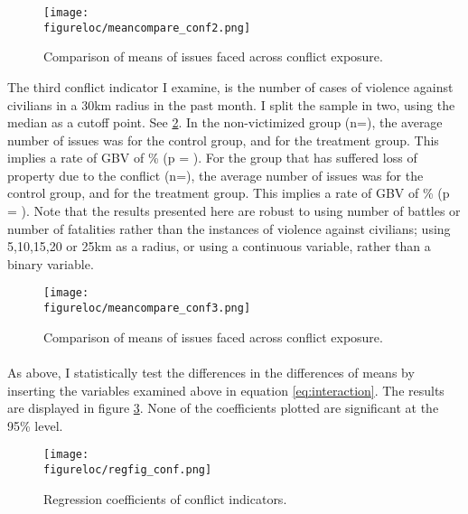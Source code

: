\documentclass[11pt,a4paper]{scrartcl} %
\newcommand{\figureloc}{C:/Users/Koen/Dropbox/PhD/Papers/CongoGBV/Figures}
\begin{document}
\begin{figure}[H]
  \texttt{[image: \\figureloc/meancompare\_conf2.png]}
  \caption{Comparison of means of issues faced across conflict exposure.}
  \label{fig:meancompare_conf2}
\end{figure}


The third conflict indicator I examine, is the number of cases of violence against civilians in a 30km radius in the past month. I split the sample in two, using the median as a cutoff point. See \ref{fig:meancompare_conf3}. In the non-victimized group (n=), the average number of issues was  for the control group, and  for the treatment group. This implies a rate of GBV of \% (p = ). For the group that has suffered loss of property due to the conflict (n=), the average number of issues was  for the control group, and  for the treatment group. This implies a rate of GBV of \% (p = ). Note that the results presented here are robust to using number of battles or number of fatalities rather than the instances of violence against civilians; using 5,10,15,20 or 25km as a radius, or using a continuous variable, rather than a binary variable.  

\begin{figure}[H]
  \texttt{[image: \\figureloc/meancompare\_conf3.png]}
  \caption{Comparison of means of issues faced across conflict exposure.}
  \label{fig:meancompare_conf3}
\end{figure}


\paragraph{}
As above, I statistically test the differences in the differences of means by inserting the variables examined above in equation \ref{eq:interaction}. The results are displayed in figure \ref{fig:regfig_conf}. None of the coefficients plotted are significant at the 95\% level.

\begin{figure}[H]
  \texttt{[image: \\figureloc/regfig\_conf.png]}
  \caption{Regression coefficients of conflict indicators.}
  \label{fig:regfig_conf}
\end{figure}
\end{document}
